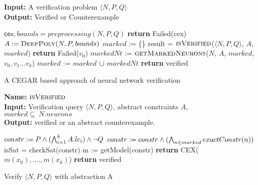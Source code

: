 \begin{algorithm}[t]
  \textbf{Input: } A verification problem $\langle N,P,Q \rangle$ \\
  \textbf{Output: } Verified or Counterexample
  \begin{algorithmic}[1]
    \State $\mathsf{cex}, bounds = preprocessing(N,P,Q)$
      \State \textbf{return} Failed(cex) 
    \EndIf
    \State $A := \textsc{DeepPoly}{(N,P, bounds)}$
    \State $marked$ := \{\}
      \State result = $\textsc{isVerified}$($\langle N,P,Q \rangle$, $A$, $marked$)
          \State \textbf{return} Failed(${v_0}$) 
        \Else
        \State $markedNt$ := $\textsc{getMarkedNeurons}$($N$, $A$, $marked$, ${v_0}, {v_1} ... {v_k}$)
          \State $marked$ := $marked$ ${\cup}$ $markedNt$
        \EndIf
      \Else
        \State \textbf{return} verified
      \EndIf
    \EndWhile
  \end{algorithmic}
  \caption{A CEGAR based approach of neural network verification}
  \label{algo:main}
\end{algorithm}
\begin{algorithm}[t]
  \textbf{Name: } $\textsc{isVerified}$ \\
  \textbf{Input: } Verification query $\langle N,P,Q \rangle$, abstract constraints $A$, $marked \subseteq ~ N.neurons$ \\
  \textbf{Output: } verified or an abstract counterexample. 
  \begin{algorithmic}[1]
    \State $constr := P \land (\bigwedge_{i=1}^k A.lc_i)\land \neg Q$
    \State $constr := constr \land (\bigwedge_{n \in marked} exactConstr(n))$ 
    \State isSat = checkSat(constr)
      \State m := getModel(constr)
      \State \textbf{return} CEX($m(x_0),....,m(x_k)$)
    \Else
      \State \textbf{return} verified
    \EndIf
  \end{algorithmic}
  \caption{Verify $\langle N,P,Q \rangle$ with abstraction A}
  \label{algo:verif1}
\end{algorithm}


